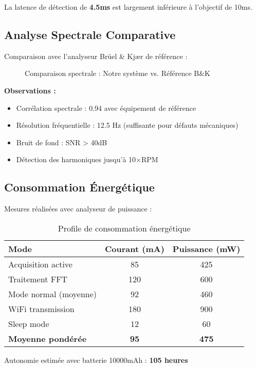 La latence de détection de \textbf{4.5ms} est largement inférieure à l'objectif de 10ms.

\subsection{Analyse Spectrale Comparative}

Comparaison avec l'analyseur Brüel \& Kjær de référence :

\begin{figure}[h]
\centering
\caption{Comparaison spectrale : Notre système vs. Référence B\&K}
\label{fig:fft_comparison}
\end{figure}

\textbf{Observations :}
\begin{itemize}
    \item Corrélation spectrale : 0.94 avec équipement de référence
    \item Résolution fréquentielle : 12.5 Hz (suffisante pour défauts mécaniques)
    \item Bruit de fond : SNR > 40dB
    \item Détection des harmoniques jusqu'à 10×RPM
\end{itemize}

\subsection{Consommation Énergétique}

Mesures réalisées avec analyseur de puissance :

\begin{table}[h]
\centering
\caption{Profile de consommation énergétique}
\begin{tabular}{lcc}
\toprule
\textbf{Mode} & \textbf{Courant (mA)} & \textbf{Puissance (mW)} \\
\midrule
Acquisition active & 85 & 425 \\
Traitement FFT & 120 & 600 \\
Mode normal (moyenne) & 92 & 460 \\
WiFi transmission & 180 & 900 \\
Sleep mode & 12 & 60 \\
\midrule
\textbf{Moyenne pondérée} & \textbf{95} & \textbf{475} \\
\bottomrule
\end{tabular}
\end{table}

Autonomie estimée avec batterie 10000mAh : \textbf{105 heures}

